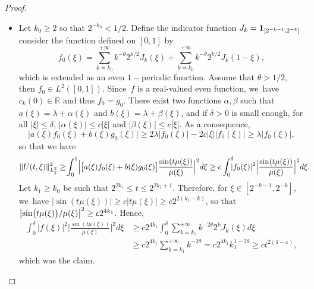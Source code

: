 \documentclass[10pt]{amsart}
\theoremstyle{definition}
\let\eps\varepsilon
\let\dis\relax
\newcommand\R{\mathbb R}
\newcommand{\bpac}[1]{\bigl[#1\bigr]}
\newcommand{\Babs}[1]{\Bigl|#1\Bigr|}
\begin{document}
\begin{proof}
\begin{itemize}
\item
Let $k_0\geq 2$ so that $2^{-k_0}<1 /2$. Define the indicator function $\dis J_k= {\mathbf 1}_{[{2^{-k-1}}, {2^{-k}}]}$ consider the function defined on $[0,1]$ by
\[
{f}_0(\xi)=\sum_{k=k_0}^{+\infty}{k^{-\theta}}{2^{k/2}}J_k(\xi)+ \sum_{k=k_0}^{+\infty}{k^{-\theta}}{2^{k/2}}J_k(1-\xi),
\]
which is extended as an even $1-$periodic function. Assume that $\theta>1/2$, then ${f}_0 \in L^2([0,1])$. Since~${f}$ is a real-valued even function, we~have $c_k(0) \in \R$ and thus ${f}_0={g}_0$. There exist two functions $\alpha, \beta$ such that $a(\xi)= \lambda +\alpha(\xi)$ and $b(\xi)=\lambda+\beta(\xi)$, and if $\delta>0$ is small enough, for all $|\xi| \leq \delta$, $|\alpha(\xi)| \leq c |\xi|$ and $|\beta(\xi)| \leq c |\xi|$. As a consequence,
\begin{equation*}
\big|a(\xi){f}_0(\xi)+b(\xi){g}_0(\xi)\big| \geq 2\lambda |{f}_0(\xi)| -2c |\xi| |{f}_0(\xi)| \geq \lambda |{f}_0(\xi)|,
\end{equation*}
so that we have
\begin{align*}
\|{U}(t,\xi)\|_{L^2_\xi}^2 &\geq\!\int_0^1 \Babs{\bpac{a(\xi){f}_0(\xi)+b(\xi){g}_0(\xi)}\frac{\sin(t\mu(\xi))}{\mu(\xi)}}^2d\xi \geq c \int_0^\delta\hspace*{-2mm} | {f}_0(\xi) |^2 \Big| \frac{\sin(t\mu(\xi))}{\mu(\xi)}\Big|^2d\xi.
\end{align*}
Let $k_1\geq k_0$ be such that $2^{2k_1} \leq t \leq 2^{2k_1+1}$. Therefore, for $\xi \in {[{2^{-k-1}}, {2^{-k}}]}$, we~have $|\sin(t\mu(\xi))| \geq c |t\mu(\xi)| \geq c 2^{2(k_1-k)}$, so that $\dis \big| {\sin\bigl(t\mu(\xi)\bigr)}/{\mu(\xi)}\big|^2 \geq c2^{4k_1}$. Hence,
\begin{align*}
\int_0^\delta | {f}(\xi) |^2 \Big| \frac{\sin(t\mu(\xi))}{\mu(\xi)}\Big|^2d\xi
&\geq c 2^{4k_1}\int_0^\delta \sum_{k=k_1}^{+\infty}k^{-2\theta} {2^{k}}J_k(\xi) d\xi \\
&\geq c 2^{4k_1} \sum_{k=k_1}^{+\infty}{k^{-2\theta}} =c 2^{4k_1}k_1^{1-2\theta} \geq c t^{2(1-\eps)},
\end{align*}
which was the claim.\qedhere
\end{itemize}
\end{proof}

\appendix
\end{document}
